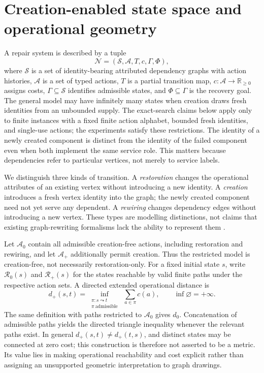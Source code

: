 \documentclass[11pt,a4paper]{article}
\begin{document}
\section{Creation-enabled state space and operational geometry}
A repair system is described by a tuple
\begin{equation}\label{eq:gonspace}
\mathcal{N}=(\mathcal{S},\mathcal{A},T,c,\Gamma,\Phi),
\end{equation}
where $\mathcal{S}$ is a set of identity-bearing attributed dependency graphs with action histories, $\mathcal{A}$ is a set of typed actions, $T$ is a partial transition map, $c:\mathcal{A}\to\mathbb{R}_{\geq0}$ assigns costs, $\Gamma\subseteq\mathcal{S}$ identifies admissible states, and $\Phi\subseteq\Gamma$ is the recovery goal. The general model may have infinitely many states when creation draws fresh identities from an unbounded supply. The exact-search claims below apply only to finite instances with a fixed finite action alphabet, bounded fresh identities, and single-use actions; the experiments satisfy these restrictions. The identity of a newly created component is distinct from the identity of the failed component even when both implement the same service role. This matters because dependencies refer to particular vertices, not merely to service labels.

We distinguish three kinds of transition. A \emph{restoration} changes the operational attributes of an existing vertex without introducing a new identity. A \emph{creation} introduces a fresh vertex identity into the graph; the newly created component need not yet serve any dependent. A \emph{rewiring} changes dependency edges without introducing a new vertex. These types are modelling distinctions, not claims that existing graph-rewriting formalisms lack the ability to represent them \cite{Ehrig2006,Konig2018,Fernandez2005}.

Let $\mathcal{A}_{0}$ contain all admissible creation-free actions, including restoration and rewiring, and let $\mathcal{A}_{+}$ additionally permit creation. Thus the restricted model is creation-free, not necessarily restoration-only. For a fixed initial state $s$, write $\mathcal{R}_{0}(s)$ and $\mathcal{R}_{+}(s)$ for the states reachable by valid finite paths under the respective action sets. A directed extended operational distance is
\begin{equation}\label{eq:distance}
d_{+}(s,t)=\inf_{\substack{\pi:s\leadsto t\\\pi\ \mathrm{admissible}}}\ \sum_{a\in\pi}c(a),\qquad \inf\varnothing=+\infty.
\end{equation}
The same definition with paths restricted to $\mathcal{A}_{0}$ gives $d_{0}$. Concatenation of admissible paths yields the directed triangle inequality whenever the relevant paths exist. In general $d_{+}(s,t)\ne d_{+}(t,s)$, and distinct states may be connected at zero cost; this construction is therefore not asserted to be a metric. Its value lies in making operational reachability and cost explicit rather than assigning an unsupported geometric interpretation to graph drawings.
\end{document}
